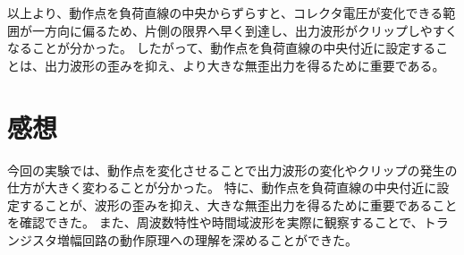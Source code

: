 \documentclass[article]{jlreq}
\begin{document}
以上より、動作点を負荷直線の中央からずらすと、コレクタ電圧が変化できる範囲が一方向に偏るため、片側の限界へ早く到達し、出力波形がクリップしやすくなることが分かった。
したがって、動作点を負荷直線の中央付近に設定することは、出力波形の歪みを抑え、より大きな無歪出力を得るために重要である。


\section{感想}
今回の実験では、動作点を変化させることで出力波形の変化やクリップの発生の仕方が大きく変わることが分かった。
特に、動作点を負荷直線の中央付近に設定することが、波形の歪みを抑え、大きな無歪出力を得るために重要であることを確認できた。
また、周波数特性や時間域波形を実際に観察することで、トランジスタ増幅回路の動作原理への理解を深めることができた。
\end{document}
